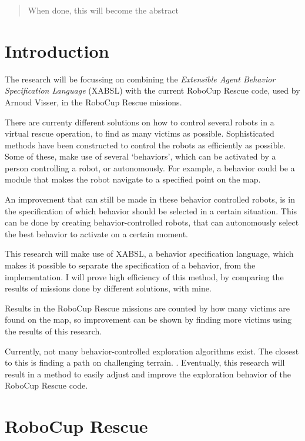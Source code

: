 \documentclass[a4paper,10pt]{article}
\begin{document}


\begin{abstract}
When done, this will become the abstract
\end{abstract}

\begin{multicols}{2}
\section{Introduction}
The research will be focussing on combining the \textit{Extensible Agent
Behavior Specification Language} (XABSL) with the current RoboCup Rescue code, used
by Arnoud Visser, in the RoboCup Rescue missions. 

There are currenty different solutions on how to control several robots in a
virtual rescue operation, to find as many victims as possible. Sophisticated
methods have been constructed to control the robots as efficiently as possible.
Some of these, make use of several `behaviors', which can be activated by a
person controlling a robot, or autonomously. For example, a behavior could be a
module that makes the robot navigate to a specified point on the map.

An improvement that can still be made in these behavior controlled robots, is in 
the specification of which behavior should be selected in a certain situation. This can be done by creating
behavior-controlled robots, that can autonomously select the best behavior to
activate on a certain moment.

This research will make use of XABSL, a behavior specification language, which
makes it possible to separate the specification of a behavior, from the implementation.
I will prove high efficiency of this method,
by comparing the results of missions done by different solutions, with
mine. 

Results in the RoboCup Rescue missions are counted by how many victims
are found on the map, so improvement can be shown by finding more victims using
the results of this research.

Currently, not many behavior-controlled exploration algorithms exist. The
closest to this is finding a path on challenging terrain. 
\cite{seraji2002behavior} . Eventually, this research will result in a method to
easily adjust and improve the exploration behavior of the RoboCup Rescue code.


\section{RoboCup Rescue}

\end{multicols}
\end{document}
